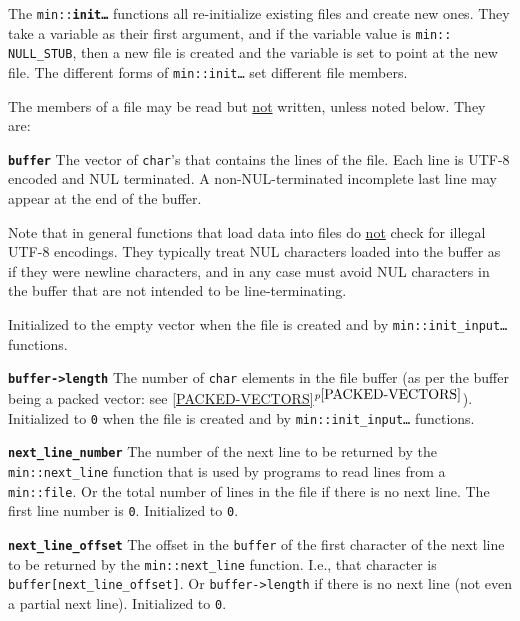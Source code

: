 \documentclass[12pt]{article}
\makeatletter
\newcommand{\ttmkey}[2]{{\tt \bf #1}\index{#1@{\tt #1}!#2}}
\newcommand{\ttindex}[1]{\index{#1@{\tt #1}}}
\newcommand{\minindex}[1]{\ttindex{min::#1}\ttindex{#1}}
\newcommand{\itemref}[1]{\ref{#1}$^{p\pageref{#1}}$}
\newcommand{\EOL}{\penalty \exhyphenpenalty}
\newcommand{\GT}{{\tt >}}
\newenvironment{itemlist}[1][1.2in]%
	{\begin{list}{}{\setlength{\labelwidth}{#1}%
		        \setlength{\leftmargin}{\labelwidth}%
		        \addtolength{\leftmargin}{+0.2in}%
		        \renewcommand{\makelabel}[1]{##1\hfill}}}%
	{\end{list}}
\newcommand{\MINKEY}[1]{{\tt \bf #1}\minindex{#1}}
\makeatother
\begin{document}
The {\tt min::}\MINKEY{init\ldots} functions all re-initialize existing
files and create new ones.  They take a variable as their
first argument, and if the variable value is {\tt min::\EOL
NULL\_\EOL STUB}, then a new file is created and the
variable is set to point at the new file.
The different forms of {\tt min::\EOL init\ldots} set different
file members.

The members of a file may be read but \underline{not} written, unless
noted below.  They are:

\begin{itemlist}[1.4in]

\item[\ttmkey{buffer}{in {\tt min::file}}]
The vector of {\tt char}'s that contains the lines of the file.  Each
line is UTF-8 encoded and NUL terminated.  A non-NUL-terminated incomplete
last line may appear at the end of the buffer.

Note that in general functions that load data into files do \underline{not}
check for illegal UTF-8 encodings.  They typically treat NUL characters
loaded into the buffer as if they were newline characters, and in any
case must avoid NUL characters in the buffer that are not intended
to be line-terminating.

Initialized to the empty vector when the file is created and by
{\tt min::\EOL init\_\EOL input\ldots} functions.

\item[\ttmkey{buffer-\GT length}{in {\tt min::file}}]
The number of {\tt char} elements in the file buffer
(as per the buffer being a packed vector: see \itemref{PACKED-VECTORS}).
Initialized to {\tt 0} when the file is created and by
{\tt min::\EOL init\_\EOL input\ldots} functions.

\item[\ttmkey{next\_\EOL line\_\EOL number}{in {\tt min::file}}]
The number of the next line to be returned by the
{\tt min::\EOL next\_\EOL line}
function that is used by programs to read lines from a {\tt min::\EOL file}.
Or the total number of lines in the file if there is no next line.
The first line number is {\tt 0}.  Initialized to {\tt 0}.

\item[\ttmkey{next\_\EOL line\_\EOL offset}{in {\tt min::file}}]
The offset in the {\tt buffer} of the first character of the
next line to be returned by the {\tt min::\EOL next\_\EOL line}
function.  I.e., that character is {\tt buffer[next\_\EOL line\_\EOL offset]}.
Or {\tt buffer->\EOL length} if there is no next line (not even a partial
next line).
Initialized to {\tt 0}.


\end{itemlist}
\end{document}
